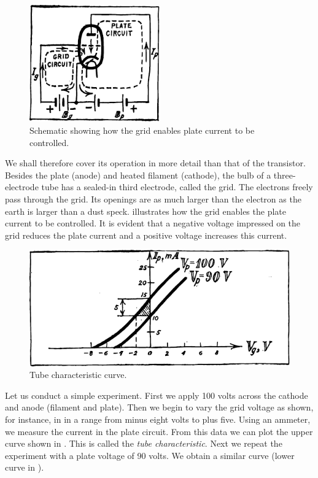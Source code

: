 \begin{figure}[!ht]
\centering
\includegraphics[width=0.5\textwidth]{figures/fig-06-05.pdf}
\caption{Schematic showing how the grid enables plate current to be controlled.}
\label{fig-6.5}
\end{figure}

We shall therefore cover its operation in more detail than that of the transistor.
Besides the plate (anode) and heated filament (cathode), the bulb of a three-electrode tube has a sealed-in third electrode, called the grid. The electrons freely pass through the grid. Its openings are as much larger than the electron as the earth is larger than a dust speck.  illustrates how the grid enables the plate current to be controlled. It is evident that a negative voltage impressed on the grid reduces the plate current and a positive voltage increases this current.


\begin{figure}[!ht]
\centering
\includegraphics[width=\textwidth]{figures/fig-06-06.pdf}
\caption{Tube characteristic curve.}
\label{fig-6.6}
\end{figure}


Let us conduct a simple experiment. First we apply 100 volts across the cathode and anode (filament and plate). Then we begin to vary the grid voltage as shown, for instance, in  in a range from minus eight volts to plus five. Using an ammeter, we measure the current in the plate circuit. From this data we can plot the upper curve shown in . This is called the \emph{tube characteristic}. Next we repeat the experiment with a plate voltage of 90 volts. We obtain a similar curve (lower curve in ).

